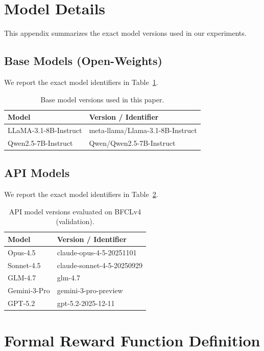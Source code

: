 \documentclass{article}
\theoremstyle{plain}
\theoremstyle{definition}
\theoremstyle{remark}
\begin{document}
\section{Model Details}
\label{app:model_details}

This appendix summarizes the exact model versions used in our experiments.

\subsection{Base Models (Open-Weights)}
We report the exact model identifiers in Table~\ref{tab:base_model_versions}.
\begin{table}[h]
\centering
\caption{Base model versions used in this paper.}
\label{tab:base_model_versions}
\small
\begin{tabular}{@{}ll@{}}
\toprule
\textbf{Model} & \textbf{Version / Identifier} \\
\midrule
LLaMA-3.1-8B-Instruct & meta-llama/Llama-3.1-8B-Instruct \\
Qwen2.5-7B-Instruct & Qwen/Qwen2.5-7B-Instruct \\
\bottomrule
\end{tabular}
\end{table}

\subsection{API Models}
We report the exact model identifiers in Table~\ref{tab:api_model_versions}.
\begin{table}[h]
\centering
\caption{API model versions evaluated on BFCLv4 (validation).}
\label{tab:api_model_versions}
\small
\begin{tabular}{@{}ll@{}}
\toprule
\textbf{Model} & \textbf{Version / Identifier} \\
\midrule
Opus-4.5 & claude-opus-4-5-20251101 \\
Sonnet-4.5 & claude-sonnet-4-5-20250929 \\
GLM-4.7 & glm-4.7 \\
Gemini-3-Pro & gemini-3-pro-preview \\
GPT-5.2 & gpt-5.2-2025-12-11 \\
\bottomrule
\end{tabular}
\end{table}


\section{Formal Reward Function Definition}
\label{app:reward_details}
\end{document}

